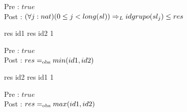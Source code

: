 Pre : \ensuremath{true}
\\
Post : \ensuremath{(\forall j : nat) (0 \leq j < long(sl)) \entoncesL idgrupo(sl_{j}) \leq res}


{
						
		\state res \asig id1			
	\Else
		\state res \asig id2			
	\endif
}
{1}
{}

Pre : \ensuremath{true}
\\
Post : \ensuremath{res \igobs min(id1, id2)}


{
						
		\state res \asig id2			
	\Else
		\state res \asig id1			
	\endif
}
{1}
{}

Pre : \ensuremath{true}
\\
Post : \ensuremath{res \igobs max(id1, id2)}

% 
% 
